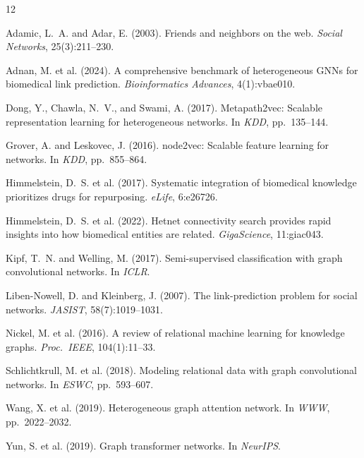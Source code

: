 \documentclass[10pt,a4paper,twocolumn]{article}
\begin{document}
\balance

\begin{thebibliography}{12}

Adamic, L.~A. and Adar, E. (2003).
\newblock Friends and neighbors on the web.
\newblock \emph{Social Networks}, 25(3):211--230.

Adnan, M. et al. (2024).
\newblock A comprehensive benchmark of heterogeneous GNNs for biomedical link prediction.
\newblock \emph{Bioinformatics Advances}, 4(1):vbae010.

Dong, Y., Chawla, N.~V., and Swami, A. (2017).
\newblock Metapath2vec: Scalable representation learning for heterogeneous networks.
\newblock In \emph{KDD}, pp.\ 135--144.

Grover, A. and Leskovec, J. (2016).
\newblock node2vec: Scalable feature learning for networks.
\newblock In \emph{KDD}, pp.\ 855--864.

Himmelstein, D.~S. et al. (2017).
\newblock Systematic integration of biomedical knowledge prioritizes drugs for repurposing.
\newblock \emph{eLife}, 6:e26726.

Himmelstein, D.~S. et al. (2022).
\newblock Hetnet connectivity search provides rapid insights into how biomedical entities are related.
\newblock \emph{GigaScience}, 11:giac043.

Kipf, T.~N. and Welling, M. (2017).
\newblock Semi-supervised classification with graph convolutional networks.
\newblock In \emph{ICLR}.

Liben-Nowell, D. and Kleinberg, J. (2007).
\newblock The link-prediction problem for social networks.
\newblock \emph{JASIST}, 58(7):1019--1031.

Nickel, M. et al. (2016).
\newblock A review of relational machine learning for knowledge graphs.
\newblock \emph{Proc.\ IEEE}, 104(1):11--33.

Schlichtkrull, M. et al. (2018).
\newblock Modeling relational data with graph convolutional networks.
\newblock In \emph{ESWC}, pp.\ 593--607.

Wang, X. et al. (2019).
\newblock Heterogeneous graph attention network.
\newblock In \emph{WWW}, pp.\ 2022--2032.

Yun, S. et al. (2019).
\newblock Graph transformer networks.
\newblock In \emph{NeurIPS}.

\end{thebibliography}
\end{document}
